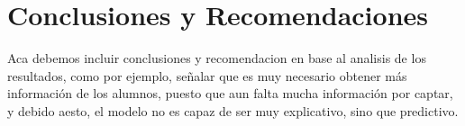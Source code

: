 \chapter{Conclusiones y Recomendaciones}
\label{ch:concureco}

Aca debemos incluir conclusiones y recomendacion en base al analisis de los resultados, como por ejemplo, señalar que es muy necesario obtener más información de los alumnos, puesto que aun falta mucha información por captar, y debido aesto, el modelo no es capaz de ser muy explicativo, sino que predictivo.
